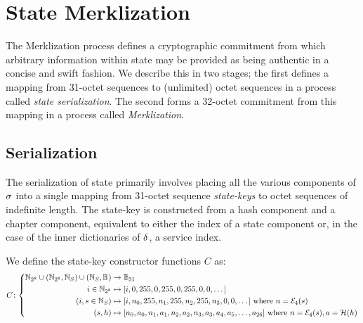 \section{State Merklization}\label{sec:statemerklization}

The Merklization process defines a cryptographic commitment from which arbitrary information within state may be provided as being authentic in a concise and swift fashion. We describe this in two stages; the first defines a mapping from 31-octet sequences to (unlimited) octet sequences in a process called \emph{state serialization}. The second forms a 32-octet commitment from this mapping in a process called \emph{Merklization}.

\subsection{Serialization}

The serialization of state primarily involves placing all the various components of $\sigma$ into a single mapping from 31-octet sequence \emph{state-keys} to octet sequences of indefinite length. The state-key is constructed from a hash component and a chapter component, equivalent to either the index of a state component or, in the case of the inner dictionaries of $\delta$, a service index.

We define the state-key constructor functions $C$ as:
\begin{equation}
  C\colon\abracegroup{
    \Nbits{8} \cup \tup{\Nbits{8}, \serviceid} \cup \tup{\serviceid, \blob} &\to \blob[31] \\
    i \in \Nbits{8} &\mapsto \sq{i, 0, 255, 0, 255, 0, 255, 0, 0, \dots} \\
    \tup{i, s \in \serviceid} &\mapsto \sq{i, n_0, 255, n_1, 255, n_2, 255, n_3, 0, 0, \dots}\ \where n = \encode[4]{s} \\
    \tup{s, h} &\mapsto \sq{n_0, a_0, n_1, a_1, n_2, a_2, n_3, a_3, a_4, a_5, \dots, a_{26}}\ \where n = \encode[4]{s}, a = \blake{h}
  }
\end{equation}

